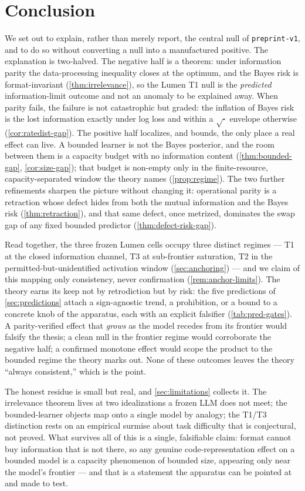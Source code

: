 \section{Conclusion}
\label{sec:conclusion}

We set out to explain, rather than merely report, the central null of
\texttt{preprint-v1}, and to do so without converting a null into a manufactured
positive. The explanation is two-halved. The negative half is a theorem: under
information parity the data-processing inequality closes at the optimum, and the
Bayes risk is format-invariant (\cref{thm:irrelevance}), so the Lumen T1 null is
the \emph{predicted} information-limit outcome and not an anomaly to be explained
away. When parity fails, the failure is not catastrophic but
graded: the inflation of Bayes risk is the lost information exactly under log
loss and within a $\sqrt{\cdot}$ envelope otherwise (\cref{cor:ratedist-gap}).
The positive half localizes, and bounds, the only place a real effect can live.
A bounded learner is not the Bayes posterior, and the room between them is a
capacity budget with no information content (\cref{thm:bounded-gap},
\cref{cor:size-gap}); that budget is non-empty only in the finite-resource,
capacity-separated window the theory names (\cref{prop:regime}). The two further
refinements sharpen the picture without changing it: operational parity is a
retraction whose defect hides from both the mutual information and the Bayes risk
(\cref{thm:retraction}), and that same defect, once metrized, dominates the swap
gap of any fixed bounded predictor (\cref{thm:defect-risk-gap}).

Read together, the three frozen Lumen cells occupy three distinct regimes ---
T1 at the closed information channel, T3 at sub-frontier saturation, T2 in the
permitted-but-unidentified activation window (\cref{sec:anchoring}) --- and we
claim of this mapping only consistency, never confirmation
(\cref{rem:anchor-limits}). The theory earns its keep not by retrodiction but by
risk: the five predictions of \cref{sec:predictions} attach a sign-agnostic
trend, a prohibition, or a bound to a concrete knob of the apparatus, each with an
explicit falsifier (\cref{tab:pred-gates}). A parity-verified effect that
\emph{grows} as the model recedes from its frontier would falsify the thesis; a
clean null in the frontier regime would corroborate the negative half; a
confirmed monotone effect would scope the product to the bounded regime the
theory marks out. None of these outcomes leaves the theory ``always consistent,''
which is the point.

The honest residue is small but real, and \cref{sec:limitations} collects it.
The irrelevance theorem lives at two idealizations a frozen LLM does not meet;
the bounded-learner objects map onto a single model by analogy; the T1/T3
distinction rests on an empirical surmise about task difficulty that is
conjectural, not proved. What survives all of this is a single,
falsifiable claim: format cannot buy information that is not there, so any
genuine code-representation effect on a bounded model is a capacity phenomenon of
bounded size, appearing only near the model's frontier --- and that is a
statement the apparatus can be pointed at and made to test.

